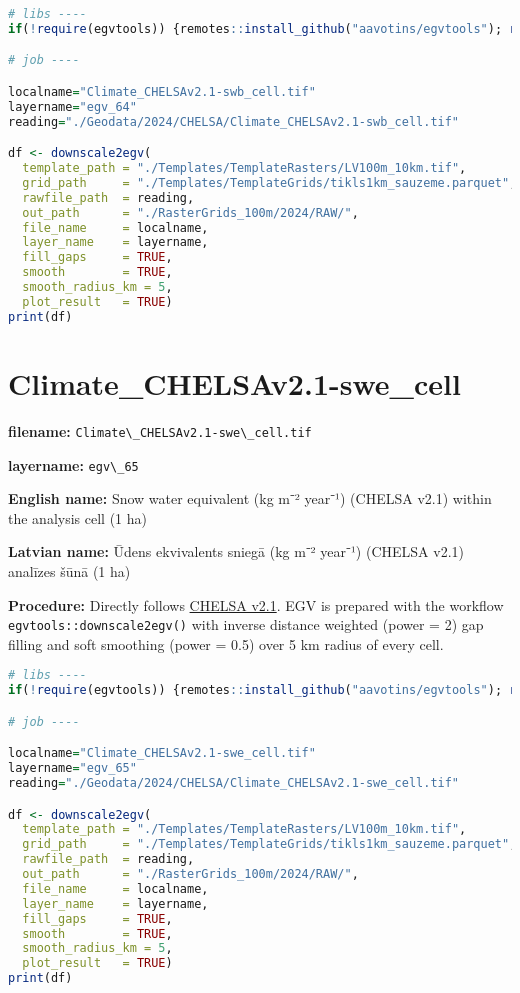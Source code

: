\documentclass[
]{book}
\newcommand{\passthrough}[1]{#1}
\begin{document}
\begin{lstlisting}[language=R]
# libs ----
if(!require(egvtools)) {remotes::install_github("aavotins/egvtools"); require(egvtools)}

# job ----

localname="Climate_CHELSAv2.1-swb_cell.tif"
layername="egv_64"
reading="./Geodata/2024/CHELSA/Climate_CHELSAv2.1-swb_cell.tif"

df <- downscale2egv(
  template_path = "./Templates/TemplateRasters/LV100m_10km.tif",
  grid_path     = "./Templates/TemplateGrids/tikls1km_sauzeme.parquet",
  rawfile_path  = reading,
  out_path      = "./RasterGrids_100m/2024/RAW/",
  file_name     = localname,
  layer_name    = layername,
  fill_gaps     = TRUE,
  smooth        = TRUE,
  smooth_radius_km = 5,
  plot_result   = TRUE)
print(df)
\end{lstlisting}

\section{Climate\_CHELSAv2.1-swe\_cell}\label{ch06.065}

\textbf{filename:} \passthrough{\lstinline!Climate\_CHELSAv2.1-swe\_cell.tif!}

\textbf{layername:} \passthrough{\lstinline!egv\_65!}

\textbf{English name:} Snow water equivalent (kg m⁻² year⁻¹) (CHELSA v2.1) within the analysis cell (1 ha)

\textbf{Latvian name:} Ūdens ekvivalents sniegā (kg m⁻² year⁻¹) (CHELSA v2.1) analīzes šūnā (1 ha)

\textbf{Procedure:} Directly follows \hyperref[Ch04.11]{CHELSA v2.1}. EGV is prepared with the
workflow \passthrough{\lstinline!egvtools::downscale2egv()!} with inverse distance weighted (power = 2)
gap filling and soft smoothing (power = 0.5) over 5 km radius of every cell.

\begin{lstlisting}[language=R]
# libs ----
if(!require(egvtools)) {remotes::install_github("aavotins/egvtools"); require(egvtools)}

# job ----

localname="Climate_CHELSAv2.1-swe_cell.tif"
layername="egv_65"
reading="./Geodata/2024/CHELSA/Climate_CHELSAv2.1-swe_cell.tif"

df <- downscale2egv(
  template_path = "./Templates/TemplateRasters/LV100m_10km.tif",
  grid_path     = "./Templates/TemplateGrids/tikls1km_sauzeme.parquet",
  rawfile_path  = reading,
  out_path      = "./RasterGrids_100m/2024/RAW/",
  file_name     = localname,
  layer_name    = layername,
  fill_gaps     = TRUE,
  smooth        = TRUE,
  smooth_radius_km = 5,
  plot_result   = TRUE)
print(df)
\end{lstlisting}
\end{document}
